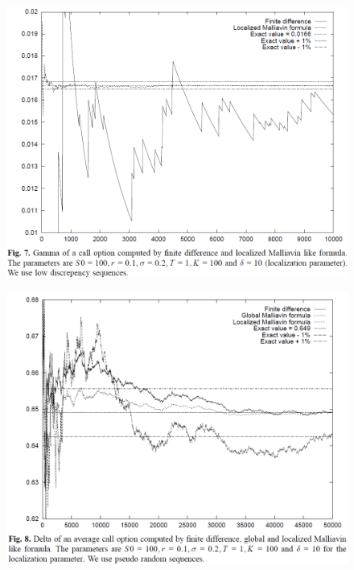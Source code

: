 \documentclass{beamer}
\begin{document}
\begin{frame}
  \begin{figure}
  \centering
  \includegraphics[scale=0.3]{fig7_fournie_99_malliavin_mc.png}\\
\end{figure}
\end{frame}

\begin{frame}
  \begin{figure}
  \centering
  \includegraphics[scale=0.3]{fig8_fournie_99_malliavin_mc.png}\\
\end{figure}
\end{frame}
\end{document}
